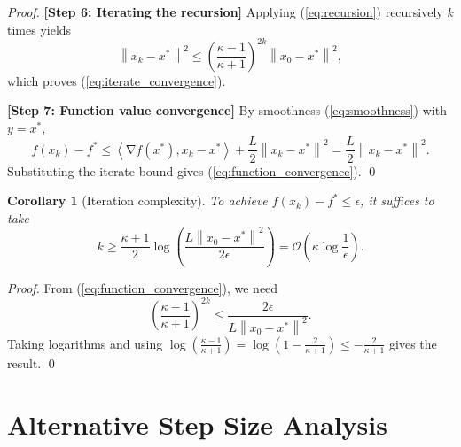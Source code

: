\documentclass[11pt]{article}
\newtheorem{corollary}{Corollary}
\DeclareMathOperator{\grad}{\nabla}
\newcommand{\norm}[1]{\left\|#1\right\|}
\newcommand{\inner}[2]{\left\langle #1, #2 \right\rangle}
\begin{document}
\begin{proof}
    \textbf{[Step 6: Iterating the recursion]} Applying (\ref{eq:recursion}) recursively $k$ times yields
    \begin{equation}
        \norm{x_k - x^*}^2 \le \left( \frac{\kappa - 1}{\kappa + 1} \right)^{2k} \norm{x_0 - x^*}^2,
    \end{equation}
    which proves (\ref{eq:iterate_convergence}).

    \textbf{[Step 7: Function value convergence]} By smoothness (\ref{eq:smoothness}) with $y = x^*$,
    \begin{equation}
        f(x_k) - f^* \le \inner{\grad f(x^*)}{x_k - x^*} + \frac{L}{2}\norm{x_k - x^*}^2 = \frac{L}{2}\norm{x_k - x^*}^2.
    \end{equation}
    Substituting the iterate bound gives (\ref{eq:function_convergence}). \qed
\end{proof}

\begin{corollary}[Iteration complexity] \label{cor:complexity}
    To achieve $f(x_k) - f^* \le \epsilon$, it suffices to take
    \begin{equation}
        k \ge \frac{\kappa + 1}{2} \log \left( \frac{L \norm{x_0 - x^*}^2}{2\epsilon} \right)
        = \mathcal{O}\left( \kappa \log \frac{1}{\epsilon} \right).
    \end{equation}
\end{corollary}
\begin{proof}
    From (\ref{eq:function_convergence}), we need
    \begin{equation}
        \left( \frac{\kappa - 1}{\kappa + 1} \right)^{2k} \le \frac{2\epsilon}{L \norm{x_0 - x^*}^2}.
    \end{equation}
    Taking logarithms and using $\log(\frac{\kappa-1}{\kappa+1}) = \log(1 - \frac{2}{\kappa+1}) \le -\frac{2}{\kappa+1}$ gives the result. \qed
\end{proof}

\section{Alternative Step Size Analysis}
\end{document}
